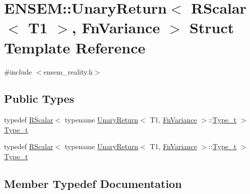 \hypertarget{structENSEM_1_1UnaryReturn_3_01RScalar_3_01T1_01_4_00_01FnVariance_01_4}{}\section{E\+N\+S\+EM\+:\+:Unary\+Return$<$ R\+Scalar$<$ T1 $>$, Fn\+Variance $>$ Struct Template Reference}
\label{structENSEM_1_1UnaryReturn_3_01RScalar_3_01T1_01_4_00_01FnVariance_01_4}


{\ttfamily \#include $<$ensem\+\_\+reality.\+h$>$}

\subsection*{Public Types}
\begin{DoxyCompactItemize}
\item 
typedef \mbox{\hyperlink{classENSEM_1_1RScalar}{R\+Scalar}}$<$ typename \mbox{\hyperlink{structENSEM_1_1UnaryReturn}{Unary\+Return}}$<$ T1, \mbox{\hyperlink{structENSEM_1_1FnVariance}{Fn\+Variance}} $>$\+::\mbox{\hyperlink{structENSEM_1_1UnaryReturn_3_01RScalar_3_01T1_01_4_00_01FnVariance_01_4_aadaa55c2cab1c15c97829d8d0a69b228}{Type\+\_\+t}} $>$ \mbox{\hyperlink{structENSEM_1_1UnaryReturn_3_01RScalar_3_01T1_01_4_00_01FnVariance_01_4_aadaa55c2cab1c15c97829d8d0a69b228}{Type\+\_\+t}}
\item 
typedef \mbox{\hyperlink{classENSEM_1_1RScalar}{R\+Scalar}}$<$ typename \mbox{\hyperlink{structENSEM_1_1UnaryReturn}{Unary\+Return}}$<$ T1, \mbox{\hyperlink{structENSEM_1_1FnVariance}{Fn\+Variance}} $>$\+::\mbox{\hyperlink{structENSEM_1_1UnaryReturn_3_01RScalar_3_01T1_01_4_00_01FnVariance_01_4_aadaa55c2cab1c15c97829d8d0a69b228}{Type\+\_\+t}} $>$ \mbox{\hyperlink{structENSEM_1_1UnaryReturn_3_01RScalar_3_01T1_01_4_00_01FnVariance_01_4_aadaa55c2cab1c15c97829d8d0a69b228}{Type\+\_\+t}}
\end{DoxyCompactItemize}


\subsection{Member Typedef Documentation}
\mbox{\label{structENSEM_1_1UnaryReturn_3_01RScalar_3_01T1_01_4_00_01FnVariance_01_4_aadaa55c2cab1c15c97829d8d0a69b228}} 
